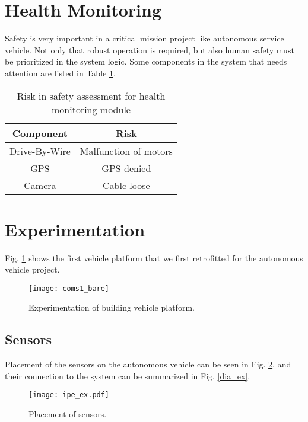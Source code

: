 \documentclass[10 pt,letterpaper,conference]{IEEEtran}
\begin{document}
\section{Health Monitoring}\label{health-monitoring}

Safety is very important in a critical mission project like autonomous
service vehicle. Not only that robust operation is required, but also
human safety must be prioritized in the system logic. Some components in
the system that needs attention are listed in Table \ref{table_risk_hm}.

\begin{table}[!t]
\renewcommand{\arraystretch}{1.3}
\caption{Risk in safety assessment for health monitoring module}
\label{table_risk_hm}
\centering
\begin{tabular}{c||c}
\hline\bfseries Component & \bfseries Risk\\
\hline
\hline Drive-By-Wire & Malfunction of motors\\
\hline
\hline GPS & GPS denied\\
\hline
\hline Camera & Cable loose\\
\hline
\end{tabular}
\end{table}

\section{Experimentation}\label{experimentation}

Fig. \ref{coms1_bare} shows the first vehicle platform that we first
retrofitted for the autonomous vehicle project.

\begin{figure}[!t]
\centering
\texttt{[image: coms1\_bare]}
\caption{Experimentation of building vehicle platform.}
\label{coms1_bare}
\end{figure}

\subsection{Sensors}\label{sensors}

Placement of the sensors on the autonomous vehicle can be seen in Fig.
\ref{ipe_ex}, and their connection to the system can be summarized in
Fig. \ref{dia_ex}.

\begin{figure}[!t]
\centering
\texttt{[image: ipe\_ex.pdf]}
\caption{Placement of sensors.}
\label{ipe_ex}
\end{figure}
\end{document}
